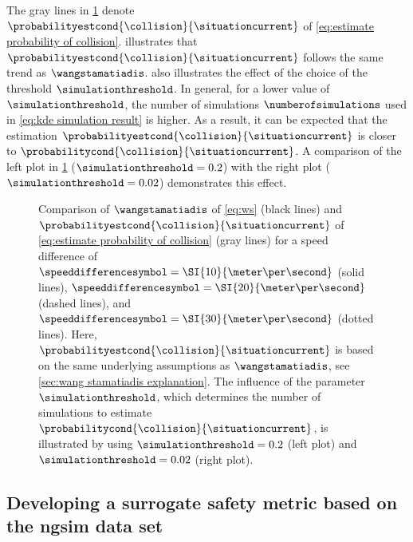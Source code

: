 The gray lines in \cref{fig:ws comparison} denote $\probabilityestcond{\collision}{\situationcurrent}$ of \cref{eq:estimate probability of collision}.
 illustrates that $\probabilityestcond{\collision}{\situationcurrent}$ follows the same trend as $\wangstamatiadis$.
 also illustrates the effect of the choice of the threshold $\simulationthreshold$.
In general, for a lower value of $\simulationthreshold$, the number of simulations $\numberofsimulations$ used in \cref{eq:kde simulation result} is higher. 
As a result, it can be expected that the estimation $\probabilityestcond{\collision}{\situationcurrent}$ is closer to $\probabilitycond{\collision}{\situationcurrent}$.
A comparison of the left plot in \cref{fig:ws comparison} ($\simulationthreshold=0.2$) with the right plot ($\simulationthreshold=0.02$) demonstrates this effect.

\setlength{\figurewidth}{.47\linewidth}
\setlength{\figureheight}{.7\figurewidth}
\begin{figure}
	\centering
	
	
	\caption{Comparison of $\wangstamatiadis$ of \cref{eq:ws} (black lines) and $\probabilityestcond{\collision}{\situationcurrent}$ of \cref{eq:estimate probability of collision} (gray lines) for a speed difference of $\speeddifferencesymbol=\SI{10}{\meter\per\second}$ (solid lines), $\speeddifferencesymbol=\SI{20}{\meter\per\second}$ (dashed lines), and $\speeddifferencesymbol=\SI{30}{\meter\per\second}$ (dotted lines).
		Here, $\probabilityestcond{\collision}{\situationcurrent}$ is based on the same underlying assumptions as $\wangstamatiadis$, see \cref{sec:wang stamatiadis explanation}.
		The influence of the parameter $\simulationthreshold$, which determines the number of simulations to estimate $\probabilitycond{\collision}{\situationcurrent}$, is illustrated by using $\simulationthreshold=0.2$ (left plot) and $\simulationthreshold=0.02$ (right plot).}
	\label{fig:ws comparison}
\end{figure}



\subsection{Developing a surrogate safety metric based on the \acs{ngsim} data set}
\label{sec:ngsim metric}

